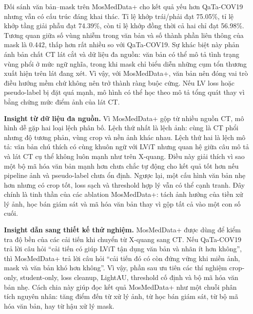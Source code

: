 Đối sánh văn bản--mask trên MosMedData+ cho kết quả yếu hơn QaTa-COV19 nhưng vẫn có cấu trúc đáng khai thác. Tỉ lệ khớp trái/phải đạt 75.05\%, tỉ lệ khớp tầng giải phẫu đạt 74.39\%, còn tỉ lệ khớp đồng thời cả hai chỉ đạt 56.98\%. Tương quan giữa số vùng nhiễm trong văn bản và số thành phần liên thông của mask là 0.442, thấp hơn rất nhiều so với QaTa-COV19. Sự khác biệt này phản ánh bản chất CT lát cắt và dữ liệu đa nguồn: văn bản có thể mô tả tình trạng vùng phổi ở mức ngữ nghĩa, trong khi mask chỉ biểu diễn những cụm tổn thương xuất hiện trên lát đang xét. Vì vậy, với MosMedData+, văn bản nên đóng vai trò điều hướng mềm chứ không nên trở thành ràng buộc cứng. Nếu LV loss hoặc pseudo-label bị đặt quá mạnh, mô hình có thể học theo mô tả tổng quát thay vì bằng chứng mức điểm ảnh của lát CT.

\textbf{Insight từ dữ liệu đa nguồn.} Vì MosMedData+ gộp từ nhiều nguồn CT, mô hình dễ gặp hai loại lệch phân bố. Lệch thứ nhất là lệch ảnh: cùng là CT phổi nhưng độ tương phản, vùng crop và nền ảnh khác nhau. Lệch thứ hai là lệch mô tả: văn bản chú thích có cùng khuôn ngữ với LViT nhưng quan hệ giữa câu mô tả và lát CT cụ thể không luôn mạnh như trên X-quang. Điều này giải thích vì sao một bộ mã hóa văn bản mạnh hơn chưa chắc tự động cho kết quả tốt hơn nếu pipeline ảnh và pseudo-label chưa ổn định. Ngược lại, một cấu hình văn bản nhẹ hơn nhưng có crop tốt, loss sạch và threshold hợp lý vẫn có thể cạnh tranh. Đây chính là tinh thần của các ablation MosMedData+: tách ảnh hưởng của tiền xử lý ảnh, học bán giám sát và mã hóa văn bản thay vì gộp tất cả vào một con số cuối.

\textbf{Insight dẫn sang thiết kế thử nghiệm.} MosMedData+ được dùng để kiểm tra độ bền của các cải tiến khi chuyển từ X-quang sang CT. Nếu QaTa-COV19 trả lời câu hỏi ``cải tiến có giúp LViT tận dụng văn bản và nhãn ít hơn không'', thì MosMedData+ trả lời câu hỏi ``cải tiến đó có còn đứng vững khi miền ảnh, mask và văn bản khó hơn không''. Vì vậy, phần sau ưu tiên các thí nghiệm crop-only, student-only, loss cleanup, LightAU, threshold cố định và bộ mã hóa văn bản nhẹ. Cách chia này giúp đọc kết quả MosMedData+ như một chuỗi phân tích nguyên nhân: tăng điểm đến từ xử lý ảnh, từ học bán giám sát, từ bộ mã hóa văn bản, hay từ hậu xử lý mask.

